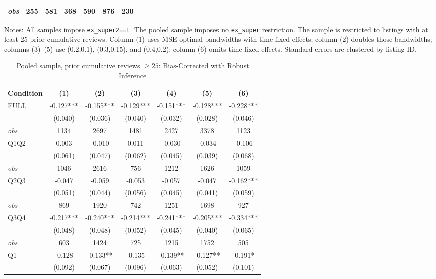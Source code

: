 \begin{table}[!htbp]
\begin{tabular}{lcccccc}
\textit{obs} & 255 & 581 & 368 & 590 & 876 & 230 \\
\bottomrule
\end{tabular}
\begin{minipage}{0.98\textwidth}\footnotesize
Notes: All samples impose \texttt{ex\_super2==t}. The pooled sample imposes no \texttt{ex\_super} restriction. The sample is restricted to listings with at least 25 prior cumulative reviews. Column (1) uses MSE-optimal bandwidths with time fixed effects; column (2) doubles those bandwidths; columns (3)--(5) use (0.2,0.1), (0.3,0.15), and (0.4,0.2); column (6) omits time fixed effects. Standard errors are clustered by listing ID.
\end{minipage}
\end{table}

\begin{table}[!htbp]
\centering
\caption{Pooled sample, prior cumulative reviews $\geq25$: Bias-Corrected with Robust Inference}
\begin{tabular}{lcccccc}
\toprule
Condition & (1) & (2) & (3) & (4) & (5) & (6) \\
\midrule
FULL & -0.127*** & -0.155*** & -0.129*** & -0.151*** & -0.128*** & -0.228*** \\
 & (0.040) & (0.036) & (0.040) & (0.032) & (0.028) & (0.046) \\
\textit{obs} & 1134 & 2697 & 1481 & 2427 & 3378 & 1123 \\
Q1Q2 & 0.003 & -0.010 & 0.011 & -0.030 & -0.034 & -0.106 \\
 & (0.061) & (0.047) & (0.062) & (0.045) & (0.039) & (0.068) \\
\textit{obs} & 1046 & 2616 & 756 & 1212 & 1626 & 1059 \\
Q2Q3 & -0.047 & -0.059 & -0.053 & -0.057 & -0.047 & -0.162*** \\
 & (0.051) & (0.044) & (0.056) & (0.045) & (0.041) & (0.059) \\
\textit{obs} & 869 & 1920 & 742 & 1251 & 1698 & 927 \\
Q3Q4 & -0.217*** & -0.240*** & -0.214*** & -0.241*** & -0.205*** & -0.334*** \\
 & (0.048) & (0.048) & (0.052) & (0.045) & (0.040) & (0.065) \\
\textit{obs} & 603 & 1424 & 725 & 1215 & 1752 & 505 \\
Q1 & -0.128 & -0.133** & -0.135 & -0.139** & -0.127** & -0.191* \\
 & (0.092) & (0.067) & (0.096) & (0.063) & (0.052) & (0.101) \\

\end{tabular}
\end{table}
